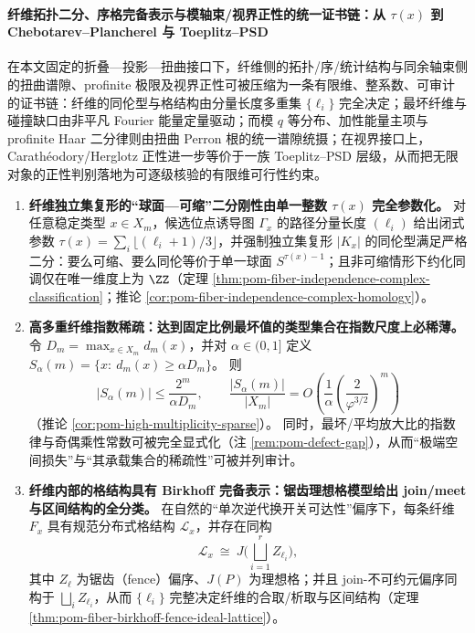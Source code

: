 \paragraph{纤维拓扑二分、序格完备表示与模轴束/视界正性的统一证书链：从 \texorpdfstring{$\tau(x)$}{tau(x)} 到 Chebotarev--Plancherel 与 Toeplitz--PSD}
在本文固定的折叠—投影—扭曲接口下，纤维侧的拓扑/序/统计结构与同余轴束侧的扭曲谱隙、profinite 极限及视界正性可被压缩为一条有限维、整系数、可审计的证书链：纤维的同伦型与格结构由分量长度多重集 \(\{\ell_i\}\) 完全决定；最坏纤维与碰撞缺口由非平凡 Fourier 能量定量驱动；而模 \(q\) 等分布、加性能量主项与 profinite Haar 二分律则由扭曲 Perron 根的统一谱隙统摄；在视界接口上，Carath\'eodory/Herglotz 正性进一步等价于一族 Toeplitz--PSD 层级，从而把无限对象的正性判别落地为可逐级核验的有限维可行性约束。
\begin{enumerate}
  \item \textbf{纤维独立集复形的“球面—可缩”二分刚性由单一整数 \texorpdfstring{$\tau(x)$}{tau(x)} 完全参数化。}
  对任意稳定类型 \(x\in X_m\)，候选位点诱导图 \(\Gamma_x\) 的路径分量长度 \((\ell_i)\) 给出闭式参数
  \(\tau(x)=\sum_i\lfloor(\ell_i+1)/3\rfloor\)，并强制独立集复形 \(|K_x|\) 的同伦型满足严格二分：要么可缩、要么同伦等价于单一球面 \(S^{\tau(x)-1}\)；且非可缩情形下约化同调仅在唯一维度上为 \(\ZZ\)（定理 \ref{thm:pom-fiber-independence-complex-classification}；推论 \ref{cor:pom-fiber-independence-complex-homology}）。

  \item \textbf{高多重纤维指数稀疏：达到固定比例最坏值的类型集合在指数尺度上必稀薄。}
  令 \(D_m=\max_{x\in X_m}d_m(x)\)，并对 \(\alpha\in(0,1]\) 定义
  \(S_\alpha(m)=\{x:\ d_m(x)\ge \alpha D_m\}\)。
  则
  \[
  |S_\alpha(m)|\le \frac{2^m}{\alpha D_m},
  \qquad
  \frac{|S_\alpha(m)|}{|X_m|}=O\!\left(\frac{1}{\alpha}\left(\frac{2}{\varphi^{3/2}}\right)^m\right)
  \]
  （推论 \ref{cor:pom-high-multiplicity-sparse}）。
  同时，最坏/平均放大比的指数律与奇偶乘性常数可被完全显式化（注 \ref{rem:pom-defect-gap}），从而“极端空间损失”与“其承载集合的稀疏性”可被并列审计。

  \item \textbf{纤维内部的格结构具有 Birkhoff 完备表示：锯齿理想格模型给出 join/meet 与区间结构的全分类。}
  在自然的“单次逆代换开关可达性”偏序下，每条纤维 \(F_x\) 具有规范分布式格结构 \(\mathcal L_x\)，并存在同构
  \[
  \mathcal L_x\ \cong\ J\!\Big(\bigsqcup_{i=1}^r Z_{\ell_i}\Big),
  \]
  其中 \(Z_{\ell}\) 为锯齿（fence）偏序、\(J(P)\) 为理想格；并且 join-不可约元偏序同构于 \(\bigsqcup_i Z_{\ell_i}\)，从而 \(\{\ell_i\}\) 完整决定纤维的合取/析取与区间结构（定理 \ref{thm:pom-fiber-birkhoff-fence-ideal-lattice}）。


\end{enumerate}
